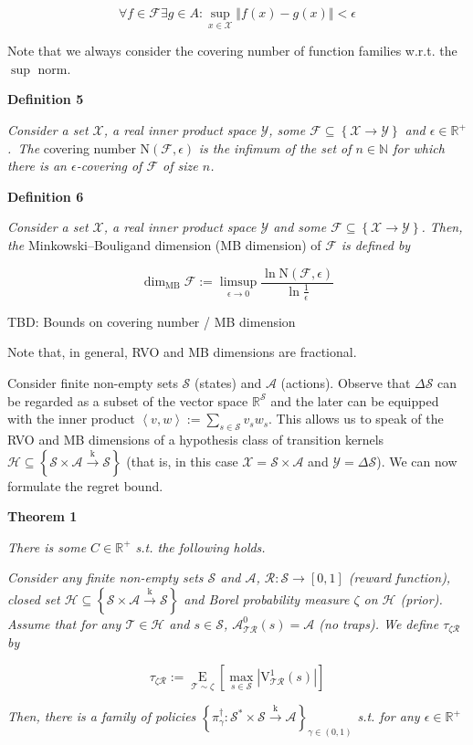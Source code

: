 \documentclass[a4paper]{article}
\newcommand{\Co}[1]{}
\newcommand{\AB}[1]{\left[#1\right]}
\newcommand{\AC}[1]{\left\{#1\right\}}
\newcommand{\Ea}[2]{\underset{#1}{\operatorname{E}}\AB{#2}}
\newcommand{\Nats}{\mathbb{N}}
\newcommand{\Reals}{\mathbb{R}}
\newcommand{\Abs}[1]{\left\vert #1 \right\vert}
\newcommand{\Norm}[1]{\left\Vert #1 \right\Vert}
\newcommand{\Chev}[1]{\left\langle #1 \right\rangle}
\newcommand{\K}{\xrightarrow{\text{k}}}
\newcommand{\X}{\mathcal{X}}
\newcommand{\Y}{\mathcal{Y}}
\newcommand{\F}{\mathcal{F}}
\newcommand{\St}{\mathcal{S}}
\newcommand{\A}{\mathcal{A}}
\newcommand{\R}{\mathcal{R}}
\newcommand{\T}{\mathcal{T}}
\newcommand{\Hy}{\mathcal{H}}
\newcommand{\MB}{\dim_{\text{MB}}}
\newcommand{\N}{\mathrm{N}}
\newcommand{\V}{\mathrm{V}}
\begin{document}
$$\forall f\in\F\exists g\in A: \sup_{x\in\X}\Norm{f(x)-g(x)}<\epsilon$$

Note that we always consider the covering number of function families w.r.t. the $\sup$ norm.

\textbf{Definition 5}\Co{b}

\textit{Consider a set $\X$, a real inner product space $\Y$, some $\F\subseteq\AC{\X\rightarrow\Y}$ and $\epsilon\in\Reals^+$.\ The}\Co{i} covering number $\N(\F,\epsilon)$ \textit{is the infimum of the set of $n\in\Nats$ for which there is an $\epsilon$-covering of $\F$ of size $n$.}\Co{i}

\textbf{Definition 6}\Co{b}

\textit{Consider a set $\X$, a real inner product space $\Y$ and some $\F\subseteq\AC{\X\rightarrow\Y}$. Then, the}\Co{i} Minkowski–Bouligand dimension (MB dimension) of $\F$ \textit{is defined by}\Co{i}

$$\MB{\F}:=\limsup_{\epsilon \rightarrow 0}{\frac{\ln{\N(\F,\epsilon)}}{\ln\frac{1}{\epsilon}}}$$

TBD: Bounds on covering number / MB dimension

Note that, in general, RVO and MB dimensions are fractional.

Consider finite non-empty sets $\St$ (states) and $\A$ (actions). Observe that $\Delta\St$ can be regarded as a subset of the vector space $\Reals^\St$ and the later can be equipped with the inner product $\Chev{v,w}:=\sum_{s\in\St} v_s w_s$. This allows us to speak of the RVO and MB dimensions of a hypothesis class of transition kernels $\Hy\subseteq\AC{\St\times\A\K\St}$ (that is, in this case $\X=\St\times\A$ and $\Y=\Delta\St$). We can now formulate the regret bound.

\textbf{Theorem 1}\Co{b}

\textit{There is some $C\in\Reals^+$ s.t. the following holds.}\Co{i}

\textit{Consider any finite non-empty sets $\St$ and $\A$, $\R:\St\rightarrow[0,1]$ (reward function), closed set $\Hy\subseteq\AC{\St\times\A\K\St}$ and Borel probability measure $\zeta$ on $\Hy$ (prior). Assume that for any $\T\in\Hy$ and $s\in\St$, $\A^0_{\T\R}(s) = \A$ (no traps). We define $\tau_{\zeta\R}$ by}\Co{i}

$$\tau_{\zeta\R}:=\Ea{\T\sim\zeta}{\max_{s\in\St}\Abs{\V^1_{\T\R}(s)}}$$

\textit{Then, there is a family of policies $\AC{\pi^\dagger_\gamma:\St^*\times\St\K\A}_{\gamma\in(0,1)}$ s.t. for any $\epsilon\in\Reals^+$}\Co{i}
\end{document}
